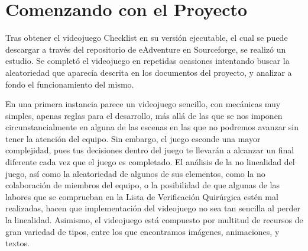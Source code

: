 
\cleardoublepage


\chapter{Comenzando con el Proyecto}
\label{makereference2}

Tras obtener el videojuego Checklist en su versión ejecutable, el cual se puede descargar a través del repositorio de eAdventure en Sourceforge, se realizó un estudio. Se completó el videojuego en repetidas ocasiones intentando buscar la aleatoriedad que aparecía descrita en los documentos del proyecto, y analizar a fondo el funcionamiento del mismo. 

En una primera instancia parece un videojuego sencillo, con mecánicas muy simples, apenas reglas para el desarrollo, más allá de las que se nos imponen circunstancialmente en alguna de las escenas en las que no podremos avanzar sin tener la atención del equipo. Sin embargo, el juego esconde una mayor complejidad, pues tus decisiones dentro del juego te llevarán a alcanzar un final diferente cada vez que el juego es completado. El análisis de la no linealidad del juego, así como la aleatoriedad de algunos de sus elementos, como la no colaboración de miembros del equipo, o la posibilidad de que algunas de las labores que se comprueban en la Lista de Verificación Quirúrgica estén mal realizadas, hacen que implementación del videojuego no sea tan sencilla al perder la linealidad. Asimismo, el videojuego está compuesto por multitud de recursos de gran variedad de tipos, entre los que encontramos imágenes, animaciones, y textos. 

